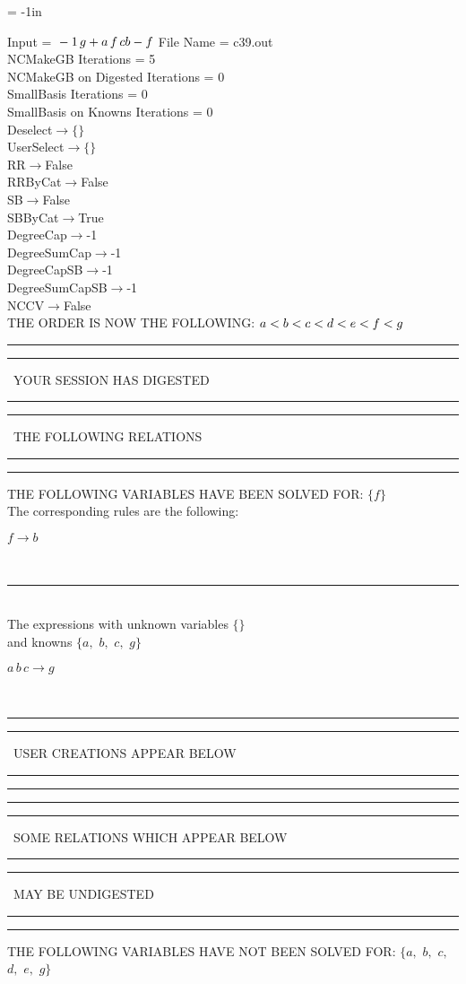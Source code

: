 \voffset = -1in
\evensidemargin 0.1in
\oddsidemargin 0.1in
\textheight 9in
\textwidth 6in

\normalsize
\baselineskip=12pt
\noindent
Input = 
$
\\-1\,
 g + a\,
 f\,
 c\\
b - f\\
$
File Name = c39.out\\
NCMakeGB Iterations = 5\\
NCMakeGB on Digested Iterations = 0\\
SmallBasis Iterations = 0\\
SmallBasis on Knowns Iterations = 0\\
Deselect$\rightarrow \{\}$\\
UserSelect$\rightarrow \{\}$\\
RR$\rightarrow $False\\
RRByCat$\rightarrow $False\\
SB$\rightarrow $False\\
SBByCat$\rightarrow $True\\
DegreeCap$\rightarrow $-1\\
DegreeSumCap$\rightarrow $-1\\
DegreeCapSB$\rightarrow $-1\\
DegreeSumCapSB$\rightarrow $-1\\
NCCV$\rightarrow $False\\
THE ORDER IS NOW THE FOLLOWING:\hfil\break
$
a<b<c<d<e<f<g\\
$
\rule[2pt]{6in}{4pt}\hfil\break
\rule[2pt]{1.879in}{4pt}
\ YOUR SESSION HAS DIGESTED\ 
\rule[2pt]{1.879in}{4pt}\hfil\break
\rule[2pt]{1.923in}{4pt}
\ THE FOLLOWING RELATIONS\ 
\rule[2pt]{1.923in}{4pt}\hfil\break
\rule[2pt]{6in}{4pt}\hfil\break
THE FOLLOWING VARIABLES HAVE BEEN SOLVED FOR:\hfil\break
$\{f\}$
\smallskip\\
The corresponding rules are the following:\smallskip\\
\begin{minipage}{6in}
$
f\rightarrow b
$
\end{minipage}\medskip\\
\rule[3pt]{6in}{.7pt}\\
The expressions with unknown variables $\{\}$\\
and knowns $\{a,
$ $
b,
$ $
c,
$ $
g\}$\smallskip\\
\begin{minipage}{6in}
$
a\,
 b\,
 c\rightarrow g
$
\end{minipage}\\
\rule[2pt]{6in}{1pt}\hfil\break
\rule[2.5pt]{1.701in}{1pt}
\ USER CREATIONS APPEAR BELOW\ 
\rule[2.5pt]{1.701in}{1pt}\hfil\break
\rule[2pt]{6in}{1pt}\hfil\break
\rule[2pt]{6in}{4pt}\hfil\break
\rule[2pt]{1.45in}{4pt}
\ SOME RELATIONS WHICH APPEAR BELOW\ 
\rule[2pt]{1.45in}{4pt}\hfil\break
\rule[2pt]{2.18in}{4pt}
\ MAY BE UNDIGESTED\ 
\rule[2pt]{2.18in}{4pt}\hfil\break
\rule[2pt]{6in}{4pt}\hfil\break
THE FOLLOWING VARIABLES HAVE NOT BEEN SOLVED FOR:\hfil\break
$\{a,
$ $
b,
$ $
c,
$ $
d,
$ $
e,
$ $
g\}$
\smallskip\\
\vspace{10pt}

